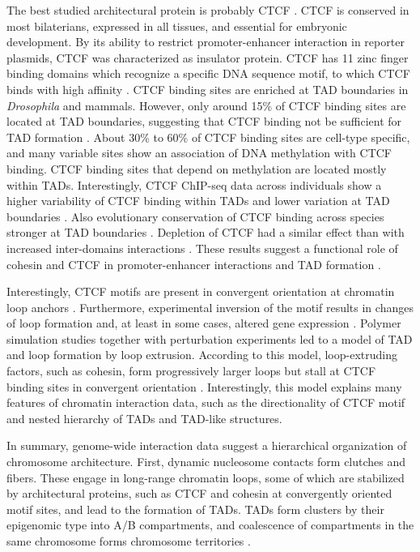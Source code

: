 \documentclass[a4paper,twoside=true,openright,parskip=full,chapterprefix=true,11pt,headings=normal,bibliography=totoc,listof=totoc,titlepage=on,captions=tableabove,draft=false]{scrreprt}
\theoremstyle{definition}
\theoremstyle{definition}
\theoremstyle{definition}
\theoremstyle{remark}
\begin{document}
The best studied architectural protein is probably CTCF \citep{Ong2014}.
CTCF is conserved in most bilaterians, expressed in all tissues, and
essential for embryonic development. By its ability to restrict
promoter-enhancer interaction in reporter plasmids, CTCF was
characterized as insulator protein. CTCF has 11 zinc finger binding
domains which recognize a specific DNA sequence motif, to which CTCF
binds with high affinity \citep{Kim2007, Nagy2016}. CTCF binding sites
are enriched at TAD boundaries in \emph{Drosophila} and mammals.
However, only around 15\% of CTCF binding sites are located at TAD
boundaries, suggesting that CTCF binding not be sufficient for TAD
formation \citep{Bonev2016}. About 30\% to 60\% of CTCF binding sites
are cell-type specific, and many variable sites show an association of
DNA methylation with CTCF binding. CTCF binding sites that depend on
methylation are located mostly within TADs. Interestingly, CTCF ChIP-seq
data across individuals show a higher variability of CTCF binding within
TADs and lower variation at TAD boundaries \citep{Ruiz-Velasco2017}.
Also evolutionary conservation of CTCF binding across species stronger
at TAD boundaries \citep{VietriRudan2015}. Depletion of CTCF had a
similar effect than with increased inter-domains interactions
\citep{Seitan2013, Zuin2014}. These results suggest a functional role of
cohesin and CTCF in promoter-enhancer interactions and TAD formation
\citep{Pombo2015}.

Interestingly, CTCF motifs are present in convergent orientation at
chromatin loop anchors \citep{Rao2014, Tang2015, VietriRudan2015}.
Furthermore, experimental inversion of the motif results in changes of
loop formation and, at least in some cases, altered gene expression
\citep{Guo2015, deWit2015, Sanborn2015}. Polymer simulation studies
together with perturbation experiments led to a model of TAD and loop
formation by loop extrusion. According to this model, loop-extruding
factors, such as cohesin, form progressively larger loops but stall at
CTCF binding sites in convergent orientation
\citep{Sanborn2015, Fudenberg2016}. Interestingly, this model explains
many features of chromatin interaction data, such as the directionality
of CTCF motif and nested hierarchy of TADs and TAD-like structures.

In summary, genome-wide interaction data suggest a hierarchical
organization of chromosome architecture. First, dynamic nucleosome
contacts form clutches and fibers. These engage in long-range chromatin
loops, some of which are stabilized by architectural proteins, such as
CTCF and cohesin at convergently oriented motif sites, and lead to the
formation of TADs. TADs form clusters by their epigenomic type into A/B
compartments, and coalescence of compartments in the same chromosome
forms chromosome territories \citep{Bonev2016}.
\end{document}
